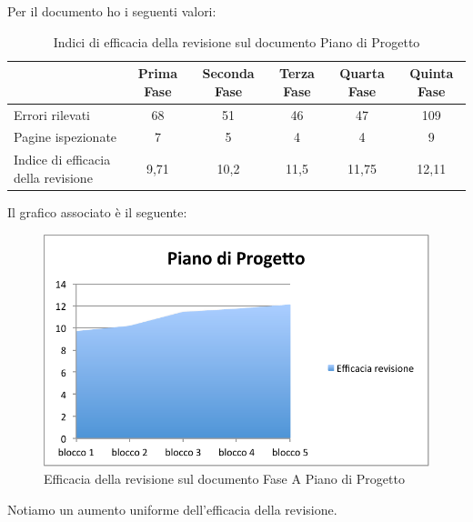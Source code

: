 						Per il documento  ho i seguenti valori:
						\begin{table}[H]\centering
							\begin{tabu}{| X[4] | c | c | c | c | c |}
								\hline
												&Prima Fase 	& Seconda Fase	& Terza Fase	& Quarta Fase 	& Quinta Fase  \\ \hline
												
								Errori rilevati				& 68		& 51 		& 46			& 47 		& 109 	 \\ \hline
								Pagine ispezionate			& 7			& 5 			& 4				& 4	 		& 9	 	  \\ \hline\hline
							
								Indice di efficacia della revisione 	 & 9,71		& 10,2 		& 11,5			& 11,75 		& 12,11 	  \\ \hline
							\end{tabu}
							\caption{Indici di efficacia della revisione sul documento Piano di Progetto}
						\end{table}
						Il grafico associato è il seguente:
						\begin{figure}[H]\centering
							\includegraphics[width=12cm]{PianoDiQualifica/Pics/EfficaciaPdPFaseA.pdf}
							\caption{Efficacia della revisione sul documento Fase A Piano di Progetto}
						\end{figure}
						Notiamo un aumento uniforme dell'efficacia della revisione.
					
